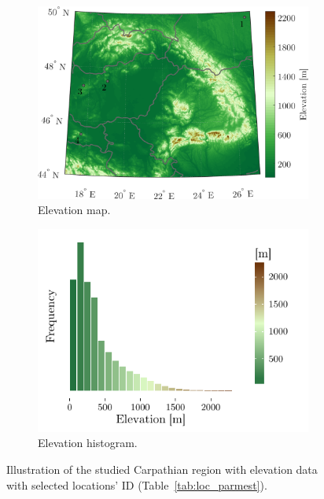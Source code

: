 \begin{figure}[htbp!]
	\begin{subfigure}[b]{0.49\textwidth}    
		\includegraphics[width=\textwidth]{elevation_map_carpathian_region.png}
		\caption{Elevation map.}
		\label{fig:elevation_map}
	\end{subfigure}
	\hfill
	\begin{subfigure}[b]{0.49\textwidth}
		\includegraphics[width=\textwidth]{hist_elevation.pdf}
		\caption{Elevation histogram.}
		\label{fig:elevation_hist}
	\end{subfigure}
	\caption{Illustration of the studied Carpathian region with elevation data with selected locations' ID (Table~\ref{tab:loc_parmest}).}
\end{figure}

